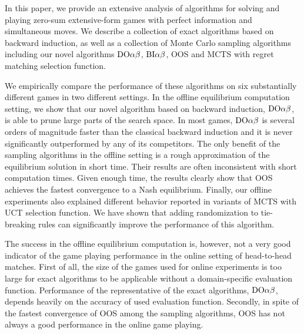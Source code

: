 
In this paper, we provide an extensive analysis of algorithms for solving and playing zero-sum extensive-form games with perfect information and simultaneous moves. We describe a collection of exact algorithms based on backward induction, as well as a collection of Monte Carlo sampling algorithms including our novel algorithms $\textrm{DO}\alpha\beta$, $\textrm{BI}\alpha\beta$, OOS and MCTS with regret matching selection function. 

We empirically compare the performance of these algorithms on six substantially different games in two different settings. In the offline equilibrium computation setting, we show that our novel algorithm based on backward induction, $\textrm{DO}\alpha\beta$, is able to prune large parts of the search space. In most games, $\textrm{DO}\alpha\beta$ is several orders of magnitude faster than the classical backward induction and it is never significantly outperformed by any of its competitors. The only benefit of the sampling algorithms in the offline setting is a rough approximation of the equilibrium solution in short time. Their results are often inconsistent with short computation times. Given enough time, the results clearly show that OOS achieves the fastest convergence to a Nash equilibrium. Finally, our offline experiments also explained different behavior reported in variants of MCTS with UCT selection function. We have shown that adding randomization to tie-breaking rules can significantly improve the performance of this algorithm.

The success in the offline equilibrium computation is, however, not a very good indicator of the game playing performance in the online setting of head-to-head matches. First of all, the size of the games used for online experiments is too large for exact algorithms to be applicable without a domain-specific evaluation function. Performance of the representative of the exact algorithms, $\textrm{DO}\alpha\beta$, depends heavily on the accuracy of used evaluation function. Secondly, in spite of the fastest convergence of OOS among the sampling algorithms, OOS has not always a good performance in the online game playing. 


